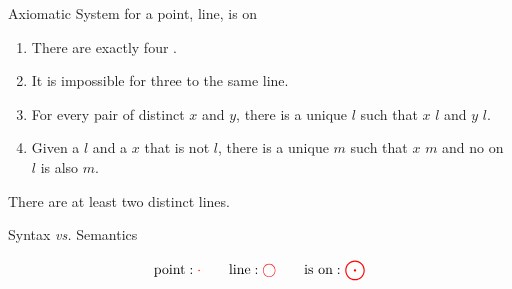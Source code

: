 \begin{frame}{}
  \begin{exampleblock}{Axiomatic System for a }
     point, line, is on

    \vspace{0.50cm}
    \begin{enumerate}[(1)]
      \item There are exactly four .
      \item It is impossible for three  to  the same line.
      \item For every pair of distinct  $x$ and $y$,
        there is a unique  $l$ such that $x$  $l$
        and $y$  $l$.
      \item Given a  $l$ and a  $x$ that is not  $l$,
        there is a unique  $m$ such that $x$  $m$
        and no  on $l$ is also  $m$.
    \end{enumerate}
  \end{exampleblock}

  \pause
  \vspace{0.30cm}
  \begin{theorem}
    There are at least two distinct lines.
  \end{theorem}
\end{frame}

\begin{frame}{}
  \begin{center}
    Syntax {\it vs.} Semantics

    \pause
    \vspace{0.30cm}
    \[
      \text{point}: \textcolor{red}{\cdot} \qquad
      \text{line}: \textcolor{red}{\bigcirc} \qquad
      \text{is on}: \textcolor{red}{\bigodot}
    \]
  \end{center}
\end{frame}

\begin{frame}{}
  \begin{center}

  \end{center}
\end{frame}

\begin{frame}
  \begin{center}
  \end{center}
\end{frame}
